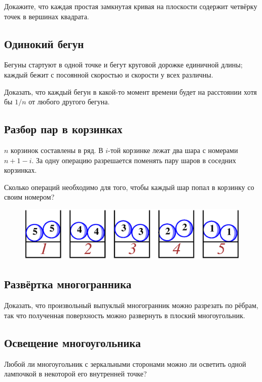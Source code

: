 Докажите, что каждая простая замкнутая кривая на плоскости содержит четвёрку точек в вершинах квадрата.

\subsection*{Одинокий бегун}

Бегуны  стартуют в одной точке и бегут круговой дорожке единичной длины;
каждый бежит с посоянной скоростью и скорости у всех различны.

Доказать, что каждый бегун в какой-то момент времени будет на расстоянии хотя бы $1/n$ от любого другого бегуна.

\subsection*{Разбор пар в корзинках}

$n$ корзинок составлены в ряд.
В $i$-той корзинке лежат два шара с номерами $n+1-i$.
За одну операцию разрешается поменять пару шаров в соседних корзинках.

Сколько операций необходимо для того, чтобы каждый шар попал в корзинку со своим номером?

\begin{figure}[h!]
\centering
\includegraphics[scale=0.5]{Figs/UnsolvedPuzzles/bins}
\end{figure}

\subsection*{Развёртка многогранника}

Доказать, что произвольный выпуклый многогранник можно разрезать по рёбрам, так что полученная поверхность можно развернуть в плоский многоугольник.

\subsection*{Освещение многоугольника}

Любой ли многоугольник с зеркальными сторонами можно ли осветить одной лампочкой в некоторой его внутренней точке?

